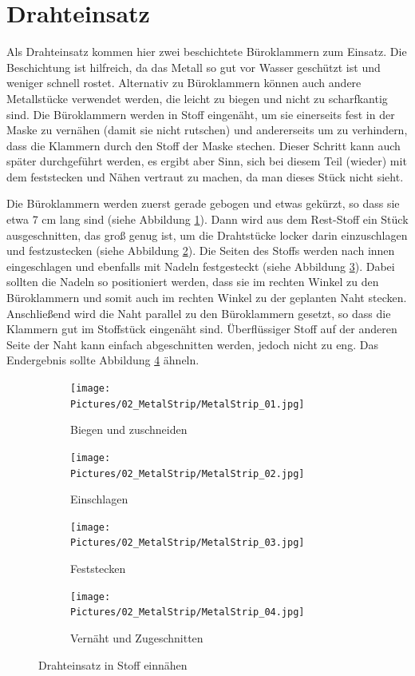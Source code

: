 \documentclass[12pt,parskip=full]{scrartcl}
\begin{document}
\section{Drahteinsatz}
Als Drahteinsatz kommen hier zwei beschichtete Büroklammern zum Einsatz. Die Beschichtung ist hilfreich, da das Metall so gut vor Wasser geschützt ist und weniger schnell rostet. Alternativ zu Büroklammern können auch andere Metallstücke verwendet werden, die leicht zu biegen und nicht zu scharfkantig sind. Die Büroklammern werden in Stoff eingenäht, um sie einerseits fest in der Maske zu vernähen (damit sie nicht rutschen) und andererseits um zu verhindern, dass die Klammern durch den Stoff der Maske stechen. Dieser Schritt kann auch später durchgeführt werden, es ergibt aber Sinn, sich bei diesem Teil (wieder) mit dem feststecken und Nähen vertraut zu machen, da man dieses Stück nicht sieht.\par


Die Büroklammern werden zuerst gerade gebogen und etwas gekürzt, so dass sie etwa 7 cm lang sind (siehe Abbildung \ref{MetaStrip1}). Dann wird aus dem Rest-Stoff ein Stück ausgeschnitten, das groß genug ist, um die Drahtstücke locker darin einzuschlagen und festzustecken (siehe Abbildung \ref{MetaStrip2}). Die Seiten des Stoffs werden nach innen eingeschlagen und ebenfalls mit Nadeln festgesteckt (siehe Abbildung \ref{MetaStrip3}). Dabei sollten die Nadeln so positioniert werden, dass sie im rechten Winkel zu den Büroklammern und somit auch im rechten Winkel zu der geplanten Naht stecken. Anschließend wird die Naht parallel zu den Büroklammern gesetzt, so dass die Klammern gut im Stoffstück eingenäht sind. Überflüssiger Stoff auf der anderen Seite der Naht kann einfach abgeschnitten werden, jedoch nicht zu eng. Das Endergebnis sollte Abbildung \ref{MetaStrip4} ähneln.

\begin{figure}[hb]
    \vspace{0.5cm}
    \centering
    \begin{subfigure}{0.48\textwidth}
        \centering
        \texttt{[image: Pictures/02\_MetalStrip/MetalStrip\_01.jpg]}
        \caption{Biegen und zuschneiden}
        \label{MetaStrip1}
    \end{subfigure}
    \begin{subfigure}{0.48\textwidth}
        \centering
        \texttt{[image: Pictures/02\_MetalStrip/MetalStrip\_02.jpg]}
        \caption{Einschlagen}
        \label{MetaStrip2}
    \end{subfigure}
    \begin{subfigure}{0.48\textwidth}
        \centering
        \texttt{[image: Pictures/02\_MetalStrip/MetalStrip\_03.jpg]}
        \caption{Feststecken}
        \label{MetaStrip3}
    \end{subfigure}
    \begin{subfigure}{0.48\textwidth}
        \centering
        \texttt{[image: Pictures/02\_MetalStrip/MetalStrip\_04.jpg]}
        \caption{Vernäht und Zugeschnitten}
        \label{MetaStrip4}
    \end{subfigure}
    \caption{Drahteinsatz in Stoff einnähen}
    \label{MetaStrip}
\end{figure}
\end{document}
